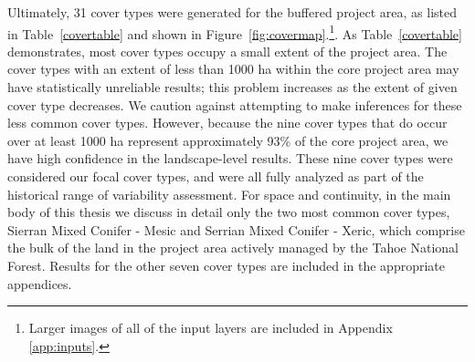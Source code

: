 Ultimately, 31 cover types were generated for the buffered project area, as listed in Table~\ref{covertable} and shown in Figure~\ref{fig:covermap}.\footnote{Larger images of all of the input layers are included in Appendix \ref{app:inputs}.}. %
As Table~\ref{covertable} demonstrates, most cover types occupy a small extent of the project area. The cover types with an extent of less than 1000 ha within the core project area may have statistically unreliable results; this problem increases as the extent of given cover type decreases. We caution against attempting to make inferences for these less common cover types. However, because the nine cover types that do occur over at least 1000 ha represent approximately 93\% of the core project area, we have high confidence in the landscape-level results. These nine cover types were considered our focal cover types, and were all fully analyzed as part of the historical range of variability assessment. For space and continuity, in the main body of this thesis we discuss in detail only the two most common cover types, Sierran Mixed Conifer - Mesic and Serrian Mixed Conifer - Xeric, which comprise the bulk of the land in the project area actively managed by the Tahoe National Forest. Results for the other seven cover types are included in the appropriate appendices. 



